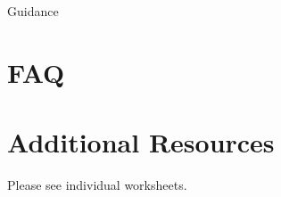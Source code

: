 \documentclass{../../fal_assignment}
\begin{document}
Guidance

\section*{FAQ}

%    		
%    		
%    		

\section*{Additional Resources}

Please see individual worksheets.

\end{document}
